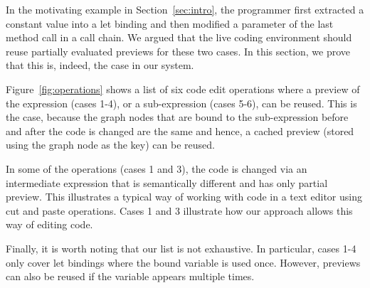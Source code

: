 \documentclass[sigplan,10pt]{acmart}\settopmatter{printfolios=true,printccs=false,printacmref=false}
\theoremstyle{plain}
\theoremstyle{definition}
\begin{document}
In the motivating example in Section~\ref{sec:intro}, the programmer first extracted a constant
value into a let binding and then modified a parameter of the last method call in a call chain.
We argued that the live coding environment should reuse partially evaluated previews for these
two cases. In this section, we prove that this is, indeed, the case in our system.

Figure~\ref{fig:operations} shows a list of six code edit operations where a preview of the 
expression (cases 1-4), or a sub-expression (cases 5-6), can be reused. This is the case, because 
the graph nodes that are bound to the sub-expression before and after the code is changed are the 
same and hence, a cached preview (stored using the graph node as the key) can be reused.

In some of the operations (cases 1 and 3), the code is changed via an intermediate expression
that is semantically different and has only partial preview. This illustrates a typical way of
working with code in a text editor using cut and paste operations. Cases 1 and 3 illustrate how
our approach allows this way of editing code.

Finally, it is worth noting that our list is not exhaustive. In particular, cases 1-4 only cover
let bindings where the bound variable is used once. However, previews can also be reused if the
variable appears multiple times.

\end{document}
